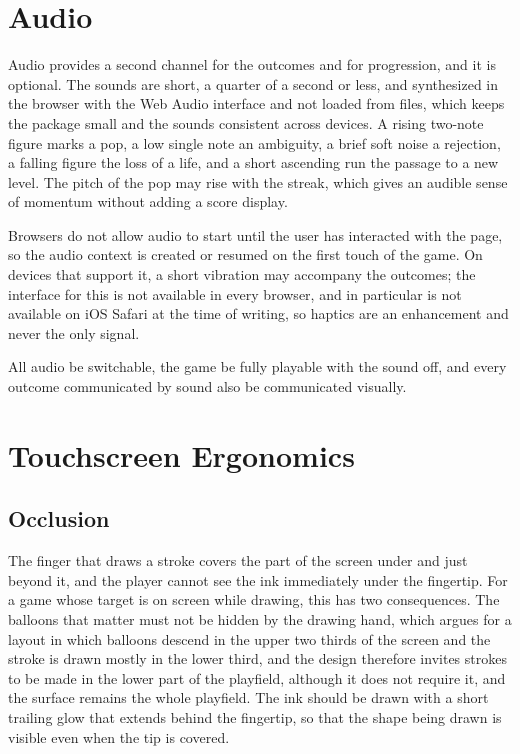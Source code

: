 \chapter{Audio}\label{ch:audio}

Audio provides a second channel for the outcomes and for progression, and it is optional. The sounds are short, a quarter of a second or less, and synthesized in the browser with the Web Audio interface and not loaded from files, which keeps the package small and the sounds consistent across devices. A rising two-note figure marks a pop, a low single note an ambiguity, a brief soft noise a rejection, a falling figure the loss of a life, and a short ascending run the passage to a new level. The pitch of the pop may rise with the streak, which gives an audible sense of momentum without adding a score display.

Browsers do not allow audio to start until the user has interacted with the page, so the audio context is created or resumed on the first touch of the game. On devices that support it, a short vibration may accompany the outcomes; the interface for this is not available in every browser, and in particular is not available on iOS Safari at the time of writing, so haptics are an enhancement and never the only signal.\evD{}

\begin{requirement}\label{req:audio}
All audio \must{} be switchable, the game \must{} be fully playable with the sound off, and every outcome communicated by sound \must{} also be communicated visually.\evS
\end{requirement}

\chapter{Touchscreen Ergonomics}\label{ch:ergonomics}

\section{Occlusion}

The finger that draws a stroke covers the part of the screen under and just beyond it, and the player cannot see the ink immediately under the fingertip. For a game whose target is on screen while drawing, this has two consequences. The balloons that matter must not be hidden by the drawing hand, which argues for a layout in which balloons descend in the upper two thirds of the screen and the stroke is drawn mostly in the lower third, and the design therefore invites strokes to be made in the lower part of the playfield, although it does not require it, and the surface remains the whole playfield. The ink should be drawn with a short trailing glow that extends behind the fingertip, so that the shape being drawn is visible even when the tip is covered.

